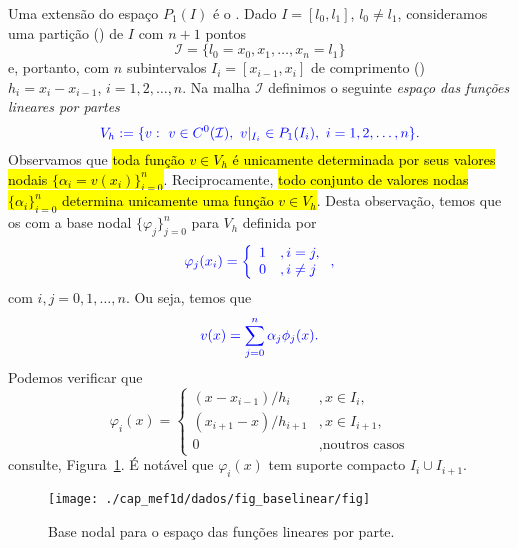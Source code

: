 Uma extensão do espaço $P_1(I)$ é o . Dado $I = [l_0, l_1]$, $l_0\neq l_1$, consideramos uma partição () de $I$ com $n+1$ pontos
\begin{equation}
  \mathcal{I} = \{l_0=x_0, x_1, \dotsc, x_n=l_1\}
\end{equation}
e, portanto, com $n$ subintervalos $I_i=[x_{i-1}, x_{i}]$ de comprimento () $h_i = x_i-x_{i-1}$, $i=1, 2, \dotsc, n$. Na malha $\mathcal{I}$ definimos o seguinte \emph{espaço das funções lineares por partes}
\begin{equation}\color{blue}V_h := \{v:~v\in C^0(\mathcal{I}),~v|_{I_i}\in P_1(I_i),~i=1,2,\dotsc,n\}.
\end{equation}
Observamos que \hl{toda função $v\in V_h$ é unicamente determinada por seus valores nodais $\{\alpha_i = v(x_i)\}_{i=0}^n$}. Reciprocamente, \hl{todo conjunto de valores nodas $\{\alpha_i\}_{i=0}^n$ determina unicamente uma função $v\in V_h$}. Desta observação, temos que os  com a base nodal $\{\varphi_j\}_{j=0}^n$ para $V_h$ definida por
\begin{equation}\color{blue}\varphi_j(x_i) = \left\{
    \begin{array}{ll}
      1 &, i=j,\\
      0 &, i\neq j
    \end{array}
\right.,
\end{equation}
com $i,j=0,1,\dotsc,n$. Ou seja, temos que
\begin{equation}\color{blue}v(x) = \sum_{j=0}^{n}\alpha_j\phi_j(x).
\end{equation}
Podemos verificar que
\begin{equation}
  \varphi_i(x) = \left\{
    \begin{array}{ll}
      (x-x_{i-1})/h_i &, x\in I_i,\\
      (x_{i+1}-x)/h_{i+1} &, x\in I_{i+1},\\
      0 &, \text{noutros casos}
    \end{array}
\right.
\end{equation}
consulte, Figura~\ref{fig:baselinear}. É notável que $\varphi_i(x)$ tem suporte compacto $I_i\cup I_{i+1}$.

\begin{figure}[h!]
  \centering
  \texttt{[image: ./cap\_mef1d/dados/fig\_baselinear/fig]}
  \caption{Base nodal para o espaço das funções lineares por parte.}
  \label{fig:baselinear}
\end{figure}

